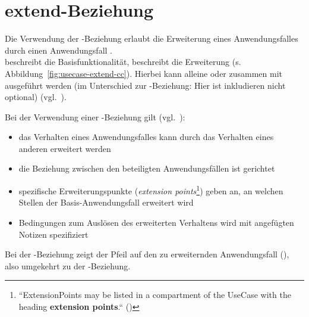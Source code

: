 \section{extend-Beziehung}

\begin{tcolorbox}[title=extend-Beziehung]
    Die Verwendung der -Beziehung erlaubt die Erweiterung eines Anwendungsfalles  durch einen Anwendungsfall .\\
     beschreibt die Basisfunktionalität,  beschreibt die Erweiterung (s. Abbildung~\ref{fig:usecase-extend-cc}).
    Hierbei kann  alleine oder zusammen mit  ausgeführt werden (im Unterschied zur -Beziehung: Hier ist inkludieren nicht optional) (vgl.~\cite[54]{Bal05}).

    \noindent
    Bei der Verwendung einer -Beziehung gilt (vgl.~\cite[53]{Buh09}):

    \begin{itemize}
        \item das Verhalten eines Anwendungsfalles kann durch das Verhalten eines anderen erweitert werden
        \item die Beziehung zwischen den beteiligten Anwendungsfällen ist gerichtet
        \item spezifische Erweiterungspunkte (\textit{extension points}\footnote{
            ``ExtensionPoints may be listed in a compartment of the UseCase with the heading \textbf{extension points}.`` (\cite[642, Hervorhebung i.O.]{OMG17})
        }) geben an, an welchen Stellen der Basis-Anwendungsfall erweitert wird
        \item Bedingungen zum Auslösen des erweiterten Verhaltens wird mit angefügten Notizen spezifiziert
    \end{itemize}

    \noindent
    Bei der -Beziehung zeigt der Pfeil auf den zu erweiternden Anwendungsfall (\cite[218]{Oes05}), also umgekehrt zu der -Beziehung.

\end{tcolorbox}

